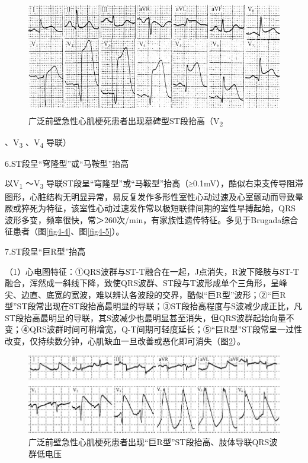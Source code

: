 \begin{figure}[!htbp]
 \centering
 \includegraphics[width=4.79167in,height=1.95833in]{./images/Image00086.jpg}
 \captionsetup{justification=centering}
 \caption{广泛前壁急性心肌梗死患者出现墓碑型ST段抬高（V\textsubscript{2}}
 \label{fig5-5}
  \end{figure} 
、V\textsubscript{3} 、V\textsubscript{4} 导联）

6.ST段呈“穹隆型”或“马鞍型”抬高

以V\textsubscript{1} ～V\textsubscript{3}
导联ST段呈“穹隆型”或“马鞍型”抬高（≥0.1mV），酷似右束支传导阻滞图形，心脏结构无明显异常，易反复发作多形性室性心动过速及心室颤动而导致晕厥或猝死为特征，该室性心动过速发作常以极短联律间期的室性早搏起始，QRS波形多变，频率很快，常＞260次/min，有家族性遗传特征。多见于Brugada综合征患者（图\ref{fig4-4}、图\ref{fig4-5}）。

7.ST段呈“巨R型”抬高

（1）心电图特征：①QRS波群与ST-T融合在一起，J点消失，R波下降肢与ST-T融合，浑然成一斜线下降，致使QRS波群、ST段与T波形成单个三角形，呈峰尖、边直、底宽的宽波，难以辨认各波段的交界，酷似“巨R型”波形；②“巨R型”ST段常出现在ST段抬高最明显的导联；③ST段抬高程度与S波减少成正比，凡ST段抬高最明显的导联，其S波减少也最明显甚至消失，但QRS波群起始向量不变；④QRS波群时间可稍增宽，Q-T间期可轻度延长；⑤“巨R型”ST段常呈一过性改变，仅持续数分钟，心肌缺血一旦改善或恶化即可消失（图\ref{fig5-6}）。

\begin{figure}[!htbp]
 \centering
 \includegraphics{./images/Image00087.jpg}
 \captionsetup{justification=centering}
 \caption{广泛前壁急性心肌梗死患者出现“巨R型”ST段抬高、肢体导联QRS波群低电压}
 \label{fig5-6}
  \end{figure} 

